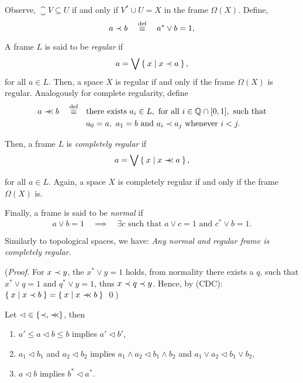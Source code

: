 Observe, $\closure V\subseteq U$ if and only if $V^*\cup U = X$ in the frame $\Omega(X)$. Define,
$$ a\prec b\quad\stackrel{\text{def}}{\equiv}\quad a^*\vee b = 1,$$

\noindent A frame $L$ is said to be \emph{regular} if
$$ a = \bigvee \Set{ x | x\prec a},$$
\noindent for all $a\in L$. Then, a space $X$ is regular if and only if the frame $\Omega(X)$ is regular.
Analogously for complete regularity, define
\begin{align*}
    a\prec\mkern-8mu\prec b\quad\stackrel{\text{def}}{\equiv}\quad &\text{there exists } a_i\in L,\text{ for all } i\in \mathbb Q\cap [0,1],\text{ such that}\\
        & a_0 = a,~ a_1 = b\text{ and } a_i\prec a_j\text{ whenever } i<j.
\end{align*}

\noindent Then, a frame $L$ is \emph{completely regular} if
$$ a = \bigvee \Set{ x | x\prec\mkern-8mu\prec a},$$

\noindent for all $a\in L$. Again, a space $X$ is completely regular if and only if the frame $\Omega(X)$ is.

Finally, a frame is said to be \emph{normal} if
$$ a\vee b = 1\quad\implies\quad \exists c\text{ such that } a\vee c = 1\text{ and }c^*\vee b = 1. $$

\noindent Similarly to topological spaces, we have: {\em \label{p:normalRegular}Any normal and regular frame is completely regular.}
\begin{center}
\parbox{0.85\linewidth}{
    (\emph{Proof.} For $x\prec y$, the $x^*\vee y = 1$ holds, from normality there exists a $q$, such that $x^*\vee q = 1$ and $q^*\vee y = 1$, thus $x\prec q\prec y$. Hence, by (CDC): $\Set{x | x\prec b} = \Set{x | x\prec\mkern-8mu\prec b}$
    \qed)
}
\end{center}
\vspace{0.5em}

\begin{observation*}\label{p:rbellowProperties}\label{p:crbellowProperties} Let $\lhd\in \{\prec, \prec\mkern-8mu\prec\}$, then
\begin{enumerate}
    \item $a'\leq a\lhd b\leq b$ implies $a'\lhd b'$,
    \item $a_1\lhd b_1$ and $a_2\lhd b_2$ implies $a_1\wedge a_2 \lhd b_1 \wedge b_2$ and $a_1\vee a_2 \lhd b_1 \vee b_2$,
    \item $a \lhd b$ implies $b^* \lhd a^*$.
\end{enumerate}
\end{observation*}

